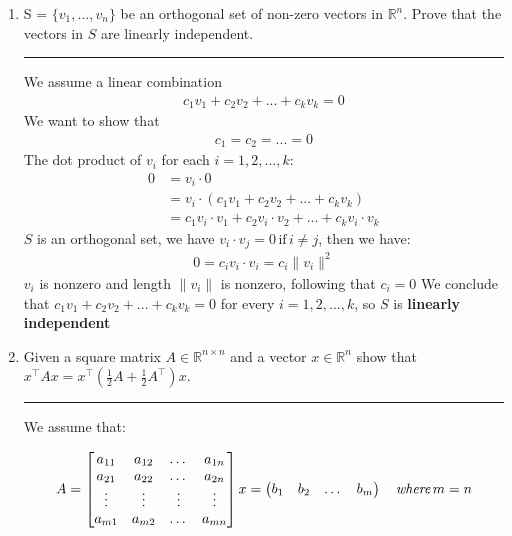 \documentclass[12pt]{article}
\begin{document}
\begin{enumerate}
    \item S = $\{v_1, ... , v_n\}$ be an orthogonal set of non-zero vectors in $\mathbb{R}^n$. Prove that the vectors in $S$ are linearly independent.

    \noindent\rule{\linewidth}{1pt}

    We assume a linear combination
    \begin{align*} 
        c_1 v_1 + c_2 v_2 + ... + c_k v_k = 0
    \end{align*}
    We want to show that
    \begin{align*} 
        c_1 = c_2 = ... = 0
    \end{align*}
    The dot product of $v_i$ for each $ i = 1,2, ... , k $:
    \begin{align*} 
        0 &= v_i \cdot 0 \\
          &= v_i \cdot (c_1 v_1 + c_2 v_2 + ... + c_k v_k) \\
          &= c_1 v_i \cdot v_1 + c_2 v_i \cdot v_2 + ... + c_k v_i \cdot v_k
    \end{align*}
    $S$ is an orthogonal set, we have $v_i \cdot v_j = 0 \, \textrm{if} \, i \neq j $, then we have:
    \begin{align*} 
        0 = c_i v_i \cdot v_i = c_i \|v_i\|^2
    \end{align*}
    $v_i$ is nonzero and length $\|v_i\|$ is nonzero, following that $c_i = 0$ \newline
    We conclude that $c_1 v_1 + c_2 v_2 + ... + c_k v_k = 0$ for every $ i = 1,2, ... , k $, so $S$ is \textbf{linearly independent}

    \item Given a square matrix $A \in \mathbb{R}^{n \times n}$ and a vector $x \in \mathbb{R}^n$ show that $x^\intercal Ax = x^\intercal ( \frac{1}{2} A + \frac{1}{2} A^\intercal )x$.
    
    \noindent\rule{\linewidth}{1pt}

    We assume that:

    \begin{align*} 
        A = 
        \begin{bmatrix}
            a_{11}    &   a_{12}    & \dots     &   a_{1n}    \\
            a_{21}    &   a_{22}    & \dots     &   a_{2n}    \\
            \vdots    &  \vdots     & \vdots    &   \vdots    \\   
            a_{m1}    &   a_{m2}    & \dots     &   a_{mn}    \\
        \end{bmatrix}
        x = 
        \begin{pmatrix}
            b_1     &
            b_2     &
            \dots  &
            b_m
        \end{pmatrix}
        \quad \emph{where} \, m = n
    \end{align*}


\end{enumerate}
\end{document}
